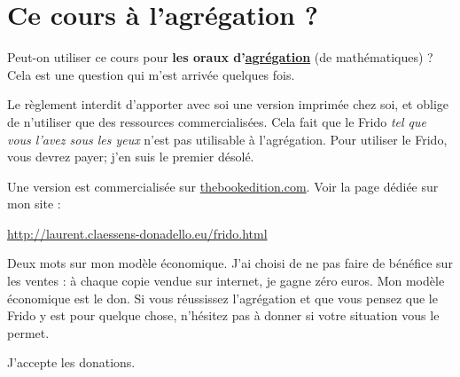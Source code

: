 
\section*{Ce cours à l'agrégation ?}

Peut-on utiliser ce cours pour \textbf{les oraux d'\href{http://agreg.org/}{agrégation}} (de mathématiques) ?  Cela est une question qui m'est arrivée quelques fois.  

Le règlement interdit d'apporter avec soi une version imprimée chez soi, et oblige de n'utiliser que des ressources commercialisées. Cela fait que le Frido \emph{tel que vous l'avez sous les yeux} n'est pas utilisable à l'agrégation. Pour utiliser le Frido, vous devrez payer; j'en suis le premier désolé.

Une version est commercialisée sur \href{http://www.thebookedition.com/fr/}{thebookedition.com}. Voir la page dédiée sur mon site :
\begin{center}
    \url{http://laurent.claessens-donadello.eu/frido.html}
\end{center}

Deux mots sur mon modèle économique. J'ai choisi de ne pas faire de bénéfice sur les ventes : à chaque copie vendue sur internet, je gagne zéro euros. Mon modèle économique est le don. Si vous réussissez l'agrégation et que vous pensez que le Frido y est pour quelque chose, n'hésitez pas à donner si votre situation vous le permet.

\vfill

J'accepte les donations.

